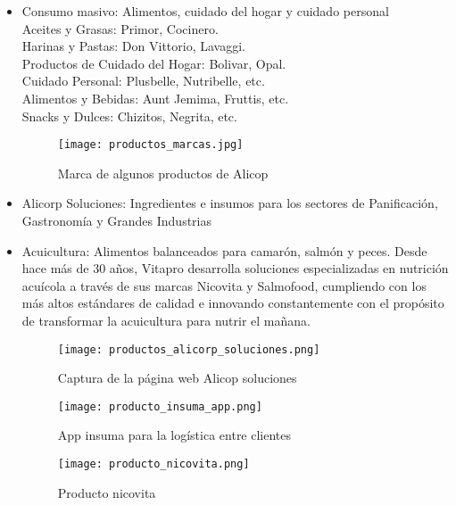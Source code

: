 \begin{itemize}
\item Consumo masivo: Alimentos, cuidado del hogar y cuidado personal
\\Aceites y Grasas: Primor, Cocinero. 
\\Harinas y Pastas: Don Vittorio, Lavaggi. 
\\Productos de Cuidado del Hogar: Bolivar, Opal. 
\\Cuidado Personal: Plusbelle, Nutribelle, etc. 
\\Alimentos y Bebidas: Aunt Jemima, Fruttis, etc. 
\\Snacks y Dulces: Chizitos, Negrita, etc. 

\begin{figure}[!ht]
    \centering
    \texttt{[image: productos\_marcas.jpg]}
    \caption{Marca de algunos productos de Alicop}
\end{figure}


\item Alicorp Soluciones: Ingredientes e insumos para los sectores de Panificación, Gastronomía y Grandes Industrias\\


\item Acuicultura: Alimentos balanceados para camarón, salmón y peces.
Desde hace más de 30 años, Vitapro desarrolla soluciones especializadas en nutrición acuícola a través de sus marcas Nicovita y Salmofood, cumpliendo con los más altos estándares de calidad e innovando constantemente con el propósito de transformar la acuicultura para nutrir el mañana.

\begin{figure}[!ht]
    \centering
    \texttt{[image: productos\_alicorp\_soluciones.png]}
    \caption{Captura de la página web Alicop soluciones}
\end{figure}

\begin{figure}[!ht]
    \centering
    \texttt{[image: producto\_insuma\_app.png]}
    \caption{App insuma para la logística entre clientes}
\end{figure}

\begin{figure}[!ht]
    \centering
    \texttt{[image: producto\_nicovita.png]}
    \caption{Producto nicovita}
\end{figure}

\end{itemize}
